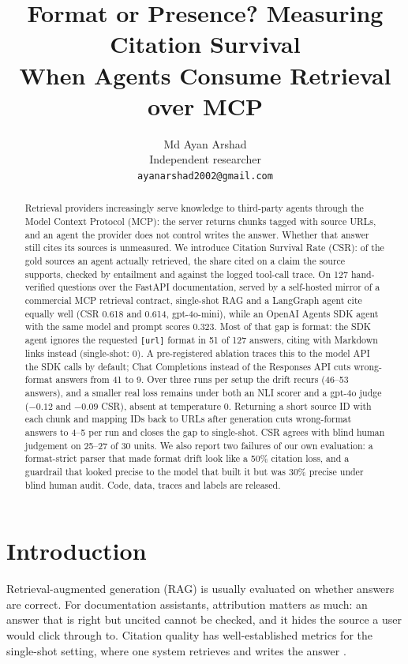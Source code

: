 \documentclass[11pt]{article}
\title{Format or Presence? Measuring Citation Survival\\When Agents Consume Retrieval over MCP}
\author{Md Ayan Arshad\\Independent researcher\\\texttt{ayanarshad2002@gmail.com}}
\date{}
\newcommand{\code}[1]{\texttt{#1}}
\begin{document}
\maketitle

\begin{abstract}
Retrieval providers increasingly serve knowledge to third-party agents through the Model Context
Protocol (MCP): the server returns chunks tagged with source URLs, and an agent the provider does
not control writes the answer. Whether that answer still cites its sources is unmeasured. We
introduce Citation Survival Rate (CSR): of the gold sources an agent actually retrieved, the share
cited on a claim the source supports, checked by entailment and against the logged tool-call
trace. On 127 hand-verified questions over the FastAPI documentation, served by a self-hosted
mirror of a commercial MCP retrieval contract, single-shot RAG and a LangGraph agent cite equally
well (CSR 0.618 and 0.614, gpt-4o-mini), while an OpenAI Agents SDK agent with the same model and
prompt scores 0.323. Most of that gap is format: the SDK agent ignores the requested \code{[url]}
format in 51 of 127 answers, citing with Markdown links instead (single-shot: 0). A pre-registered
ablation traces this to the model API the SDK calls by default; Chat Completions instead of the
Responses API cuts wrong-format answers from 41 to 9. Over three runs per setup the drift recurs
(46--53 answers), and a smaller real loss remains under both an NLI scorer and a gpt-4o judge
($-0.12$ and $-0.09$ CSR), absent at temperature 0. Returning a short source ID with each chunk and
mapping IDs back to URLs after generation cuts wrong-format answers to 4--5 per run and closes the
gap to single-shot. CSR agrees with blind human judgement on 25--27 of 30 units. We also report two
failures of our own evaluation: a format-strict parser that made format drift look like a 50\%
citation loss, and a guardrail that looked precise to the model that built it but was 30\% precise
under blind human audit. Code, data, traces and labels are released.
\end{abstract}

\section{Introduction}

Retrieval-augmented generation (RAG) \citep{lewis2020rag} is usually evaluated on whether answers
are correct. For documentation assistants, attribution matters as much: an answer that is right
but uncited cannot be checked, and it hides the source a user would click through to. Citation
quality has well-established metrics for the single-shot setting, where one system retrieves and
writes the answer \citep{gao2023alce,liu2023verifiability,rashkin2023ais}.
\end{document}
